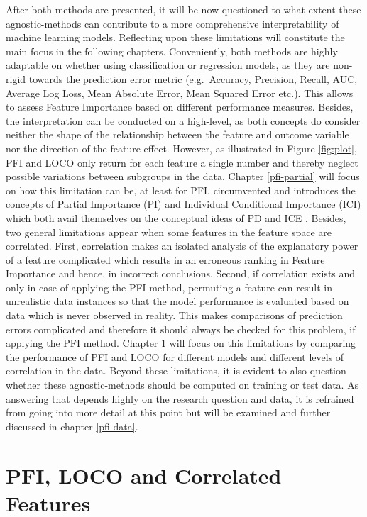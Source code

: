 \documentclass[]{krantz}
\begin{document}
After both methods are presented, it will be now questioned to what
extent these agnostic-methods can contribute to a more comprehensive
interpretability of machine learning models. Reflecting upon these
limitations will constitute the main focus in the following chapters.
Conveniently, both methods are highly adaptable on whether using
classification or regression models, as they are non-rigid towards the
prediction error metric (e.g.~Accuracy, Precision, Recall, AUC, Average
Log Loss, Mean Absolute Error, Mean Squared Error etc.). This allows to
assess Feature Importance based on different performance measures.
Besides, the interpretation can be conducted on a high-level, as both
concepts do consider neither the shape of the relationship between the
feature and outcome variable nor the direction of the feature effect.
However, as illustrated in Figure \ref{fig:plot}, PFI and LOCO only
return for each feature a single number and thereby neglect possible
variations between subgroups in the data. Chapter \ref{pfi-partial} will
focus on how this limitation can be, at least for PFI, circumvented and
introduces the concepts of Partial Importance (PI) and Individual
Conditional Importance (ICI) which both avail themselves on the
conceptual ideas of PD and ICE
\citep[see][]{casalicchio2018visualizing}. Besides, two general
limitations appear when some features in the feature space are
correlated. First, correlation makes an isolated analysis of the
explanatory power of a feature complicated which results in an erroneous
ranking in Feature Importance and hence, in incorrect conclusions.
Second, if correlation exists and only in case of applying the PFI
method, permuting a feature can result in unrealistic data instances so
that the model performance is evaluated based on data which is never
observed in reality. This makes comparisons of prediction errors
complicated and therefore it should always be checked for this problem,
if applying the PFI method. Chapter \ref{pfi-correlated} will focus on
this limitations by comparing the performance of PFI and LOCO for
different models and different levels of correlation in the data. Beyond
these limitations, it is evident to also question whether these
agnostic-methods should be computed on training or test data. As
answering that depends highly on the research question and data, it is
refrained from going into more detail at this point but will be examined
and further discussed in chapter \ref{pfi-data}.

\chapter{PFI, LOCO and Correlated Features}\label{pfi-correlated}
\end{document}

